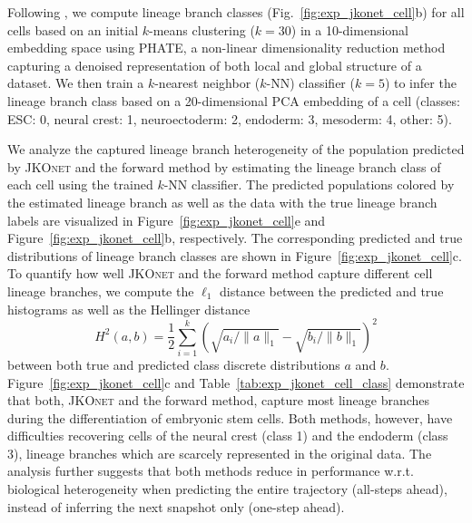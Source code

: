 Following \citet[Fig. 6, Suppl. Note 4]{moon2019visualizing}, we compute lineage branch classes (Fig.~\ref{fig:exp_jkonet_cell}b) for all cells based on an initial $k$-means clustering ($k=30$) in a 10-dimensional embedding space using PHATE, a non-linear dimensionality reduction method capturing a denoised representation of both local and global structure of a dataset.
We then train a $k$-nearest neighbor ($k$-NN) classifier ($k=5$) to infer the lineage branch class based on a 20-dimensional \acrshort{PCA} embedding of a cell (classes: ESC: 0, neural crest: 1, neuroectoderm: 2, endoderm: 3, mesoderm: 4, other: 5).

We analyze the captured lineage branch heterogeneity of the population predicted by \textsc{JKOnet} and the forward method by estimating the lineage branch class of each cell using the trained $k$-NN classifier. The predicted populations colored by the estimated lineage branch as well as the data with the true lineage branch labels are visualized in Figure~\ref{fig:exp_jkonet_cell}e and Figure~\ref{fig:exp_jkonet_cell}b, respectively.
The corresponding predicted and true distributions of lineage branch classes are shown in Figure~\ref{fig:exp_jkonet_cell}c.
To quantify how well \textsc{JKOnet} and the forward method capture  different cell lineage branches, we compute the $\ell_1$ distance between the  predicted and true histograms as well as the Hellinger distance 
\begin{equation} \label{eq:hellinger}
    H^2(a, b)=\frac{1}{2} \sum_{i=1}^{k}\left(\sqrt{a_{i}/\|a\|_1}-\sqrt{b_{i}/\|b\|_1}\right)^{2}
\end{equation}
between both true and predicted class discrete distributions $a$ and $b$.
Figure~\ref{fig:exp_jkonet_cell}c and Table~\ref{tab:exp_jkonet_cell_class} demonstrate that both, \textsc{JKOnet} and the forward method, capture most lineage branches during the differentiation of embryonic stem cells. Both methods, however, have difficulties recovering cells of the neural crest (class 1) and the endoderm (class 3), lineage branches which are scarcely represented in the original data. 
The analysis further suggests that both methods reduce in performance w.r.t. biological heterogeneity when predicting the entire trajectory (all-steps ahead), instead of inferring the next snapshot only (one-step ahead).


